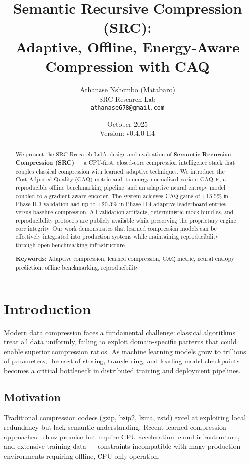 \documentclass[11pt,twocolumn]{article}
\title{Semantic Recursive Compression (SRC): \\
Adaptive, Offline, Energy-Aware Compression with CAQ}
\author{
Athanase Nshombo (Matabaro) \\
SRC Research Lab \\
\texttt{athanase678@gmail.com}
}
\date{October 2025 \\ Version: v0.4.0-H4}
\begin{document}
\maketitle

\begin{abstract}
We present the SRC Research Lab's design and evaluation of \textbf{Semantic Recursive Compression (SRC)} — a CPU-first, closed-core compression intelligence stack that couples classical compression with learned, adaptive techniques. We introduce the Cost-Adjusted Quality (CAQ) metric and its energy-normalized variant CAQ-E, a reproducible offline benchmarking pipeline, and an adaptive neural entropy model coupled to a gradient-aware encoder. The system achieves CAQ gains of +15.5\% in Phase H.3 validation and up to +20.3\% in Phase H.4 adaptive leaderboard entries versus baseline compression. All validation artifacts, deterministic mock bundles, and reproducibility protocols are publicly available while preserving the proprietary engine core integrity. Our work demonstrates that learned compression models can be effectively integrated into production systems while maintaining reproducibility through open benchmarking infrastructure.

\textbf{Keywords:} Adaptive compression, learned compression, CAQ metric, neural entropy prediction, offline benchmarking, reproducibility
\end{abstract}

\section{Introduction}

Modern data compression faces a fundamental challenge: classical algorithms treat all data uniformly, failing to exploit domain-specific patterns that could enable superior compression ratios. As machine learning models grow to trillions of parameters, the cost of storing, transferring, and loading model checkpoints becomes a critical bottleneck in distributed training and deployment pipelines.

\subsection{Motivation}

Traditional compression codecs (gzip, bzip2, lzma, zstd) excel at exploiting local redundancy but lack semantic understanding. Recent learned compression approaches~\cite{balle2018variational} show promise but require GPU acceleration, cloud infrastructure, and extensive training data — constraints incompatible with many production environments requiring offline, CPU-only operation.
\end{document}
